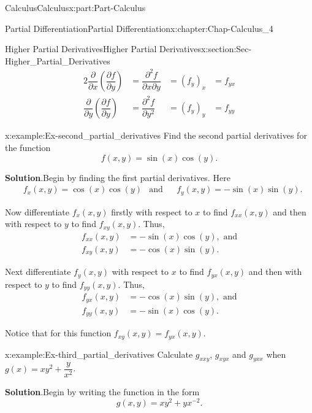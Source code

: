 \documentclass[oneside,10pt,]{book}
\newcommand{\blocktitlefont}{\relax}
\numberwithin{equation}{section}
\newcommand{\amp}{&}
\begin{document}
\begin{partptx}{Calculus}{}{Calculus}{}{}{x:part:Part-Calculus}
\begin{chapterptx}{Partial Differentiation}{}{Partial Differentiation}{}{}{x:chapter:Chap-Calculus_4}
\begin{sectionptx}{Higher Partial Derivatives}{}{Higher Partial Derivatives}{}{}{x:section:Sec-Higher_Partial_Derivatives}
\begin{alignat*}{2}
\dfrac{\partial}{\partial x} \left( \dfrac{\partial f}{\partial y} \right) \amp = \dfrac{\partial^2 f}{\partial x \partial y} \amp = (f_y)_x \amp = f_{yx}\\
\dfrac{\partial}{\partial y} \left( \dfrac{\partial f}{\partial y} \right) \amp = \dfrac{\partial^2 f}{\partial y^2} \amp = (f_y)_y \amp = f_{yy}
\end{alignat*}
%
\begin{example}{}{x:example:Ex-second_partial_derivatives}%
Find the second partial derivatives for the function%
\begin{equation*}
f(x,y) = \sin(x) \cos(y)\text{.}
\end{equation*}
%
\par\smallskip%
\noindent\textbf{\blocktitlefont Solution}.\hypertarget{g:solution:id546567}{}\quad{}Begin by finding the first partial derivatives. Here%
\begin{align*}
\amp f_x(x,y) = \cos(x)\cos(y) \amp \text{and} \amp \amp f_y(x,y) = - \sin(x) \sin(y)\text{.}
\end{align*}
%
\par
Now differentiate \(f_x(x,y)\) firstly with respect to \(x\) to find \(f_{xx}(x,y)\) and then with respect to \(y\) to find \(f_{xy}(x,y)\). Thus,%
\begin{align*}
f_{xx}(x,y) \amp = -\sin(x) \cos(y), \, \, \text{and}\\
f_{xy}(x,y) \amp = -\cos(x) \sin(y).
\end{align*}
%
\par
Next differentiate \(f_y(x,y)\) with respect to \(x\) to find \(f_{yx}(x,y)\) and then with respect to \(y\) to find \(f_{yy}(x,y)\). Thus,%
\begin{align*}
f_{yx}(x,y) \amp = -\cos(x) \sin(y), \, \, \text{and}\\
f_{yy}(x,y) \amp = -\sin(x) \cos(y).
\end{align*}
%
\par
Notice that for this function \(f_{xy}(x,y) = f_{yx}(x,y)\).%
\end{example}
\begin{example}{}{x:example:Ex-third_partial_derivatives}%
Calculate \(g_{xxy}\), \(g_{xyx}\) and \(g_{yxx}\) when \(g(x)=xy^2 + \dfrac{y}{x^2}\).%
\par\smallskip%
\noindent\textbf{\blocktitlefont Solution}.\hypertarget{g:solution:id546675}{}\quad{}Begin by writing the function in the form%
\begin{equation*}
g(x,y) = xy^2 + yx^{-2}\text{.}
\end{equation*}

\end{example}
\end{sectionptx}
\end{chapterptx}
\end{partptx}
\end{document}
